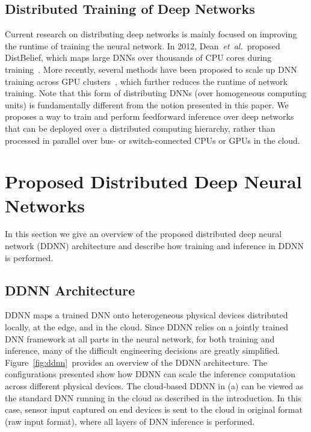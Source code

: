 \documentclass[10pt, conference, compsocconf]{IEEEtran}
\newcommand{\etal}{\emph{et~al.}}
\begin{document}
\subsection{Distributed Training of Deep Networks}
Current research on distributing deep networks is mainly focused on improving the runtime of training the neural network. In 2012, Dean~\etal~proposed DistBelief, which maps large DNNs over thousands of CPU cores during training~\cite{dean2012large}. More recently, several methods have been proposed to scale up DNN training across GPU clusters~\cite{iandola2015firecaffe, dean2015large}, which further reduces the runtime of network training. Note that this form of distributing DNNs (over homogeneous computing units) is fundamentally different from the notion presented in this paper. We proposes a way to train and perform feedforward inference over deep networks that can be deployed over a distributed computing hierarchy, rather than processed in parallel over bus- or switch-connected CPUs or GPUs in the cloud.

\section{Proposed Distributed Deep Neural Networks}
In this section we give an overview of the proposed distributed deep neural network (DDNN) architecture and describe how training and inference in DDNN is performed.

\subsection{DDNN Architecture}
DDNN maps a trained DNN onto heterogeneous physical devices distributed locally, at the edge, and in the cloud. Since DDNN relies on a jointly trained DNN framework at all parts in the neural network, for both training and inference, many of the difficult engineering decisions are greatly simplified. Figure~\ref{fig:ddnn}~provides an overview of the DDNN architecture. The configurations presented show how DDNN can scale the inference computation across different physical devices. The cloud-based DDNN in (a) can be viewed as the standard DNN running in the cloud as described in the introduction. In this case, sensor input captured on end devices is sent to the cloud in original format (raw input format), where all layers of DNN inference is performed. 
\end{document}
